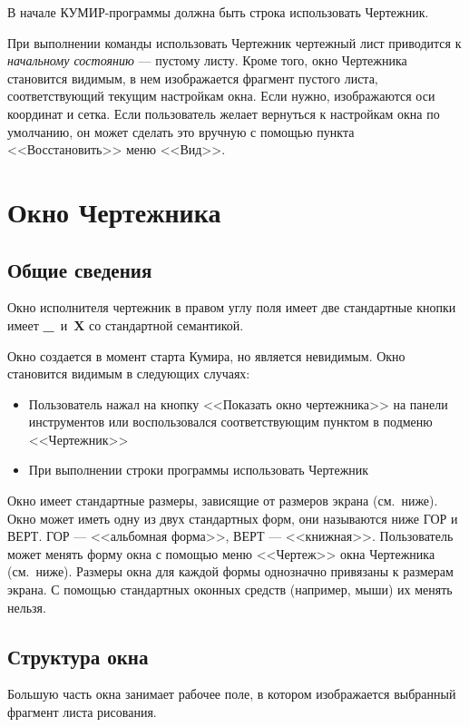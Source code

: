 В начале КУМИР-программы должна быть строка \textsf{использовать Чертежник}.

При выполнении команды \textsf{использовать Чертежник} чертежный лист  приводится к \emph{\mbox{начальному} состоянию} --- пустому листу. Кроме того,  окно Чертежника становится видимым, в нем изображается фрагмент  пустого листа, соответствующий текущим настройкам окна.  Если нужно, изображаются оси координат и сетка. Если пользователь желает вернуться к настройкам окна по умолчанию, он может сделать это вручную с помощью пункта \mbox{<<Восстановить>>} меню <<Вид>>.

\section{Окно Чертежника}

\subsection{Общие сведения}

Окно исполнителя чертежник в правом углу поля имеет две стандартные кнопки имеет \textbf{\_}~и~\textbf{X} со стандартной семантикой.

Окно создается в момент старта Кумира, но является невидимым.  Окно становится видимым в следующих случаях:
\begin{itemize}
\item Пользователь нажал на кнопку <<Показать окно чертежника>> на панели инструментов или воспользовался соответствующим пунктом в подменю <<Чертежник>>
\item При выполнении строки программы \textsf{использовать Чертежник}
\end{itemize}

Окно имеет стандартные размеры, зависящие от размеров экрана (см.~ниже). Окно может иметь одну из двух стандартных форм, они называются ниже ГОР и ВЕРТ. ГОР --- <<альбомная форма>>, ВЕРТ --- <<книжная>>. Пользователь может менять форму окна с помощью меню <<Чертеж>> окна Чертежника (см.~ниже). Размеры окна для каждой формы однозначно привязаны к размерам экрана. С помощью стандартных оконных средств (например, мыши) их менять нельзя.

\subsection{Структура окна}
Большую часть окна занимает рабочее поле, в котором изображается выбранный фрагмент листа рисования.

